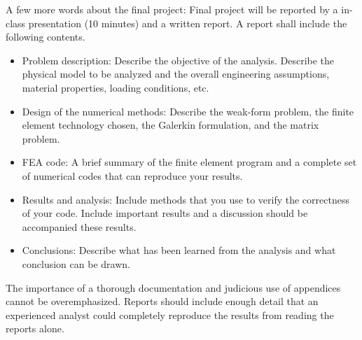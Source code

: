 \documentclass[12pt]{article}
\begin{document}
\begin{enumerate}
A few more words about the final project: Final project will be reported by a in-class presentation (10 minutes) and a written report. A report shall include the following contents.
\begin{itemize}
\item Problem description: Describe the objective of the analysis. Describe the physical model to be analyzed and the overall engineering assumptions, material properties, loading conditions, etc.
\item Design of the numerical methods: Describe the weak-form problem, the finite element technology chosen, the Galerkin formulation, and the matrix problem.
\item FEA code: A brief summary of the finite element program and a complete set of numerical codes that can reproduce your results.
\item Results and analysis: Include methods that you use to verify the correctness of your code. Include important results and a discussion should be accompanied these results.
\item Conclusions: Describe what has been learned from the analysis and what conclusion can be drawn.
\end{itemize}
The importance of a thorough documentation and judicious use of appendices cannot be overemphasized. Reports should include enough detail that an experienced analyst could completely reproduce the results from reading the reports alone.
\end{enumerate}
\end{document}
